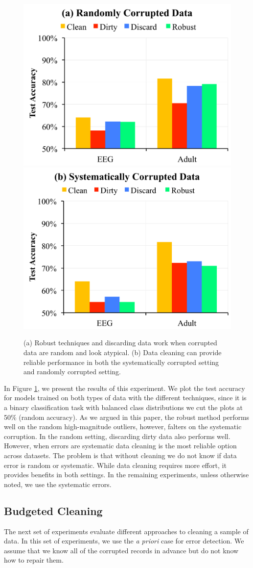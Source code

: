 \begin{figure}[ht!]
\centering
 \includegraphics[width=0.49\columnwidth]{exp/exp2.pdf}
 \includegraphics[width=0.49\columnwidth]{exp/exp1.pdf}
 \caption{(a) Robust techniques and discarding data work when corrupted data are random and look atypical. (b) Data cleaning can provide reliable performance in both the systematically corrupted setting and randomly corrupted setting.\label{sys-rand}}
\end{figure}

In Figure \ref{sys-rand}, we present the results of this experiment.
We plot the test accuracy for models trained on both types of data with the different techniques, since it is a binary classification task with balanced class distributions we cut the plots at 50\% (random accuracy).
As we argued in this paper, the robust method performs well on the random high-magnitude outliers, however, falters on the systematic corruption.
In the random setting, discarding dirty data also performs well.
However, when errors are systematic data cleaning is the most reliable option across datasets.
The problem is that without cleaning we do not know if data error is random or systematic.
While data cleaning requires more effort, it provides benefits in both settings.
In the remaining experiments, unless otherwise noted, we use the systematic errors.

\subsection{Budgeted Cleaning}
The next set of experiments evaluate different approaches to cleaning a sample of data.
In this set of experiments, we use the \emph{a priori} case for error detection.
We assume that we know all of the corrupted records in advance but do not know how to repair them. 

